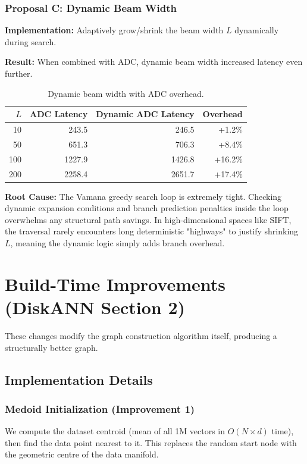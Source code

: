 \documentclass[10pt]{article}
\begin{document}
\subsubsection{Proposal C: Dynamic Beam Width}

\textbf{Implementation:} Adaptively grow/shrink the beam width $L$ dynamically during search.

\textbf{Result:} When combined with ADC, dynamic beam width increased latency even further.

\begin{table}[H]
\centering
\begin{tabular}{rrrr}
\toprule
$L$ & ADC Latency & Dynamic ADC Latency & Overhead \\
\midrule
10  & 243.5  & 246.5  & +1.2\% \\
50  & 651.3  & 706.3  & +8.4\% \\
100 & 1227.9 & 1426.8 & +16.2\% \\
200 & 2258.4 & 2651.7 & +17.4\% \\
\bottomrule
\end{tabular}
\caption{Dynamic beam width with ADC overhead.}
\label{tab:proposal_c}
\end{table}

\textbf{Root Cause:} The Vamana greedy search loop is extremely tight. Checking dynamic expansion conditions and branch prediction penalties inside the loop overwhelms any structural path savings. In high-dimensional spaces like SIFT, the traversal rarely encounters long deterministic "highways" to justify shrinking $L$, meaning the dynamic logic simply adds branch overhead.


\section{Build-Time Improvements (DiskANN Section 2)}

These changes modify the graph construction algorithm itself, producing a structurally better graph.

\subsection{Implementation Details}

\subsubsection{Medoid Initialization (Improvement 1)}
We compute the dataset centroid (mean of all 1M vectors in $O(N \times d)$ time), then find the data point nearest to it. This replaces the random start node with the geometric centre of the data manifold.
\end{document}
